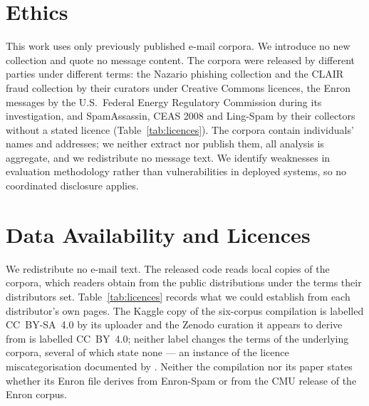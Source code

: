 \documentclass[twoside,11pt]{article}
\begin{document}

\section*{Ethics}

This work uses only previously published e-mail corpora. We introduce no new
collection and quote no message content. The corpora were released by
different parties under different terms: the Nazario phishing collection and
the CLAIR fraud collection by their curators under Creative Commons licences,
the Enron messages by the U.S.\ Federal Energy Regulatory Commission during its
investigation, and SpamAssassin, CEAS 2008 and Ling-Spam by their collectors
without a stated licence (Table~\ref{tab:licences}). The corpora
contain individuals' names and addresses; we neither extract nor publish them,
all analysis is aggregate, and we redistribute no message text. We identify
weaknesses in evaluation methodology rather than vulnerabilities in deployed
systems, so no coordinated disclosure applies.

\section*{Data Availability and Licences}
\label{sec:availability}

We redistribute no e-mail text. The released code reads local copies of the
corpora, which readers obtain from the public distributions under the terms
their distributors set. Table~\ref{tab:licences} records what we could
establish from each distributor's own pages. The Kaggle copy of the six-corpus
compilation is labelled CC~BY-SA~4.0 by its uploader and the Zenodo curation
it appears to derive from is labelled CC~BY~4.0; neither label changes the
terms of the underlying corpora, several of which state none --- an instance
of the licence miscategorisation documented by \citet{longpre2024audit}. Neither the compilation nor its paper states
whether its Enron file derives from Enron-Spam or from the CMU release of the
Enron corpus.
\end{document}
